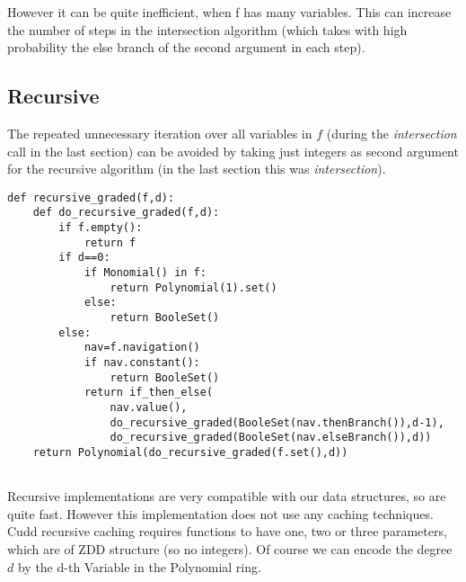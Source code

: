 \documentclass[]{article}
\newcommand{\functionname}[1]{\textit{#1}\xspace}
\begin{document}
However it can be quite inefficient, when f has many variables.
This can increase the number of steps in the intersection algorithm (which takes with high probability the else branch of the second argument in each step).
\subsection{Recursive}
The repeated unnecessary iteration over all variables in $f$ (during the \functionname{intersection} call in the last section) can be avoided by taking just integers as second argument for the recursive algorithm (in the last section this was \functionname{intersection}).

\begin{verbatim}
def recursive_graded(f,d):
    def do_recursive_graded(f,d):
        if f.empty():
            return f
        if d==0:
            if Monomial() in f:
                return Polynomial(1).set()
            else:
                return BooleSet()
        else:
            nav=f.navigation()
            if nav.constant():
                return BooleSet()
            return if_then_else(
                nav.value(),
                do_recursive_graded(BooleSet(nav.thenBranch()),d-1),
                do_recursive_graded(BooleSet(nav.elseBranch()),d))
    return Polynomial(do_recursive_graded(f.set(),d))
        
\end{verbatim}
Recursive implementations are very compatible with our data structures, so are quite fast. However this implementation does not use any caching techniques. Cudd recursive caching requires functions to have one, two or three parameters, which are of ZDD structure (so no integers).
Of course we can encode the degree $d$ by the d-th Variable in the Polynomial
ring.
\end{document}
